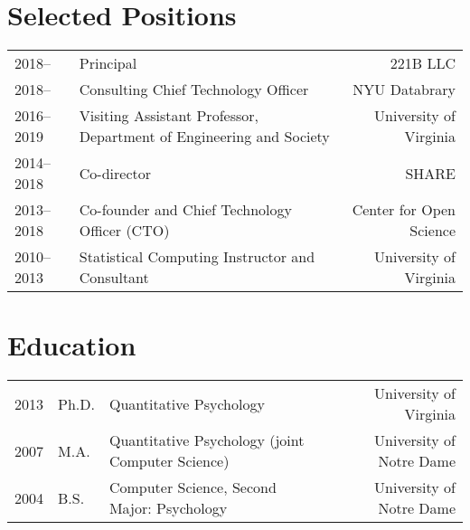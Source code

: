 \documentclass[11pt]{article}
\begin{document}
\maketitle


\section*{Selected Positions}
\begin{tabularx}{\textwidth}{l X r}
2018--				& Principal & 221B LLC\\
2018--				& Consulting Chief Technology Officer & NYU Databrary\\
2016--2019				& Visiting Assistant Professor, Department of Engineering and Society & University of Virginia \\
2014--2018  	& Co-director & SHARE \\
2013--2018		& Co-founder and Chief Technology Officer (CTO) & Center for Open Science\\
2010--2013 	& Statistical Computing Instructor and Consultant &  University of Virginia\\
\end{tabularx}

\section*{Education}
\begin{tabularx}{\textwidth}{llXr}
2013	& Ph.D.		& Quantitative Psychology                     					& University of Virginia\\
2007 	& M.A.		& Quantitative Psychology (joint Computer Science)	& University of Notre Dame\\
2004 	& B.S.		& Computer Science, Second Major: Psychology    		& University of Notre Dame\\
\end{tabularx}
\end{document}
